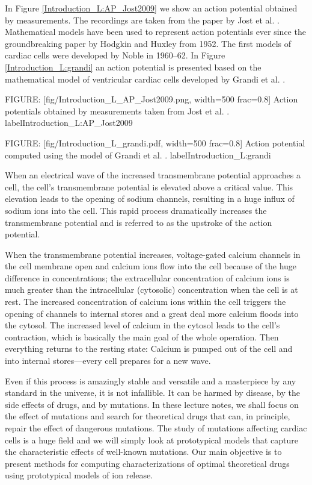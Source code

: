 In Figure \ref{Introduction_L:AP_Jost2009}  we show an action potential obtained by measurements. The recordings are taken from the paper by Jost et al. \cite{Jost2009}. Mathematical models have been used to represent action potentials ever since the groundbreaking paper by Hodgkin and Huxley \cite{Hodgkin1952} from 1952. The first models of cardiac cells were developed by Noble \cite{Noble1960,Noble1962} in 1960--62. In Figure \ref{Introduction_L:grandi} an action potential is presented based on the mathematical model of ventricular cardiac cells developed by Grandi et al. \cite{Grandi2010B}.

FIGURE: [fig/Introduction_L_AP_Jost2009.png, width=500 frac=0.8]  Action potentials obtained by measurements taken from Jost et al. \cite{Jost2009}. label{Introduction_L:AP_Jost2009}

FIGURE: [fig/Introduction_L_grandi.pdf, width=500 frac=0.8] Action potential computed using the model of Grandi et al. \cite{Grandi2010B}.  label{Introduction_L:grandi}

When an electrical wave of the increased transmembrane potential approaches a cell, the cell's transmembrane potential is elevated above a critical value. This elevation leads to the opening of sodium channels, resulting in a huge influx of sodium ions into the cell. This rapid process dramatically increases the transmembrane potential and is referred to as the upstroke of the action potential.

When the transmembrane potential increases, voltage-gated calcium channels in the cell membrane open and calcium ions flow into the cell because of the huge difference in concentrations; the extracellular concentration of calcium ions is much greater than the intracellular (cytosolic) concentration when the cell is at rest. The increased concentration of calcium ions within the cell triggers the opening of channels to internal stores and a great deal more calcium floods into the cytosol.  The increased level of calcium in the cytosol leads to the cell's contraction, which is basically the main goal of the whole operation. Then everything returns to the resting state: Calcium is pumped out of the cell and into internal stores---every cell prepares for a new wave.

Even if this process is amazingly stable and versatile and a masterpiece by any standard in the universe, it is not infallible. It can be harmed by disease, by  the side effects of drugs, and by mutations. In these lecture notes, we shall focus on the effect of mutations and search for theoretical drugs that can, in principle, repair the effect of dangerous mutations. The study of mutations affecting cardiac cells is a huge field and we will simply look at prototypical models that capture the characteristic effects of well-known mutations. Our main objective is to present methods for computing characterizations of optimal theoretical drugs using prototypical models of ion release.


